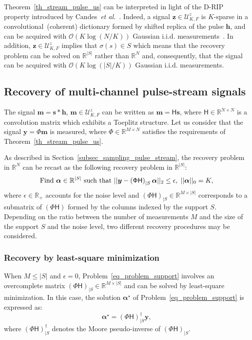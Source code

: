 \documentclass{article}
\newcommand{\etal}{\textit{et al.}}
\newcommand{\vect}[1]{\bm{#1}}
\newcommand{\mat}[1]{\mathsf{#1}}
\theoremstyle{definition}
\begin{document}
Theorem~\ref{th_stream_pulse_us} can be interpreted in light of the D-RIP property introduced by Candes~\etal{}~\cite{candes11}. Indeed, a signal $\vect{z} \in \mathcal{U}^z_{K,F}$ is $K$-sparse in a convolutional~(coherent) dictionary formed by shifted replica of the pulse $\vect{h}$, and can be acquired with $\mathcal{O} \left(K \log \left(N / K\right)\right)$ Gaussian i.i.d. measurements~\cite{candes11}. In addition, $\vect{z} \in \mathcal{U}^z_{K,F}$ implies that $\sigma \left(s\right) \in S$ which means that the recovery problem can be solved on $\mathbb{R}^{|S|}$ rather than $\mathbb{R}^N$ and, consequently, that the signal can be acquired with $\mathcal{O} \left(K \log \left(|S| / K\right)\right)$ Gaussian i.i.d. measurements. 

\subsection{Recovery of multi-channel pulse-stream signals}
\label{subsec_recovery_pulse_stream}
The signal $\vect{m} = \vect{s} \ast \vect{h}$, $\vect{m} \in \mathcal{U}^z_{K,F}$ can be written as $\vect{m} = \mat{H} \vect{s}$, where $\mat{H} \in \mathbb{R}^{N \times N}$ is a convolution matrix which exhibits a Toeplitz structure. Let us consider that the signal $\vect{y} = \mat{\Phi} \vect{m}$ is measured, where $\mat{\Phi} \in \mathbb{R}^{M \times N}$ satisfies the requirements of Theorem~\ref{th_stream_pulse_us}. 

As described in Section~\ref{subsec_sampling_pulse_stream}, the recovery problem in $\mathbb{R}^N$ can be recast as the following recovery problem in $\mathbb{R}^{|S|}$:
\begin{equation}
\label{eq_problem_support}
\textnormal{Find } \vect{\alpha} \in \mathbb{R}^{|S|} \textnormal{ such that } || \vect{y} - \left(\mat{\Phi H}\right)_{|S}\vect{\alpha}||_2 \leq \epsilon, \; || \vect{\alpha} ||_0 = K, 
\end{equation}
where $\epsilon \in \mathbb{R}_{+}$ accounts for the noise level and $\left(\mat{\Phi H}\right)_{|S} \in \mathbb{R}^{M \times |S|}$ corresponds to a submatrix of $\left(\mat{\Phi H}\right)$ formed by the columns indexed by the support $S$. 
Depending on the ratio between the number of measurements $M$ and the size of the support $S$ and the noise level, two different recovery procedures may be considered.
\subsubsection{Recovery by least-square minimization}
\label{subsec_ls_recovery}
When $M \leq |S|$ and $\epsilon=0$, Problem~\eqref{eq_problem_support} involves an overcomplete matrix $\left(\mat{\Phi H}\right)_{|S} \in \mathbb{R}^{M \times |S|}$ and can be solved by least-square minimization. 
In this case, the solution $\vect{\alpha}^\star$ of Problem~\eqref{eq_problem_support} is expressed as:
\begin{equation}
\label{eq_solution_LS}
	\vect{\alpha}^\star = \left(\mat{\Phi H}\right)_{|S}^\dagger  \vect{y},
\end{equation}
where $\left(\mat{\Phi H}\right)_{|S}^\dagger$ denotes the Moore pseudo-inverse of $\left(\mat{\Phi H}\right)_{|S}$.
\end{document}

